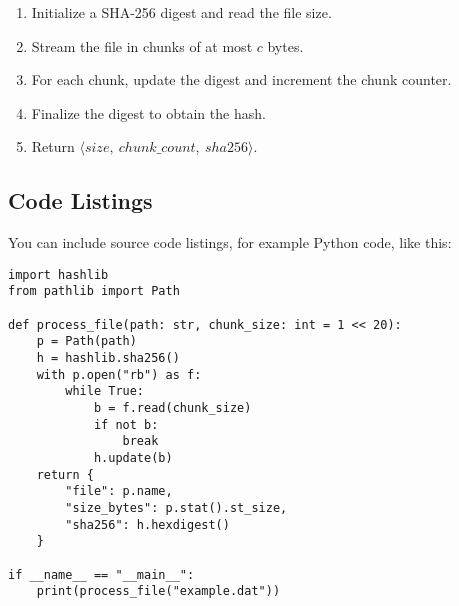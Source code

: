 \begin{enumerate}
    \item Initialize a SHA-256 digest and read the file size.
    \item Stream the file in chunks of at most $c$ bytes.
    \item For each chunk, update the digest and increment the chunk counter.
    \item Finalize the digest to obtain the hash.
    \item Return $\langle size,\ chunk\_count,\ sha256 \rangle$.
\end{enumerate}

\subsection{Code Listings}

You can include source code listings, for example Python code, like this:

\begin{lstlisting}[float=htb, caption={Source code of the file processing algorithm.}, label={lst:filehash}]
import hashlib
from pathlib import Path

def process_file(path: str, chunk_size: int = 1 << 20):
    p = Path(path)
    h = hashlib.sha256()
    with p.open("rb") as f:
        while True:
            b = f.read(chunk_size)
            if not b:
                break
            h.update(b)
    return {
        "file": p.name,
        "size_bytes": p.stat().st_size,
        "sha256": h.hexdigest()
    }

if __name__ == "__main__":
    print(process_file("example.dat"))
\end{lstlisting}
